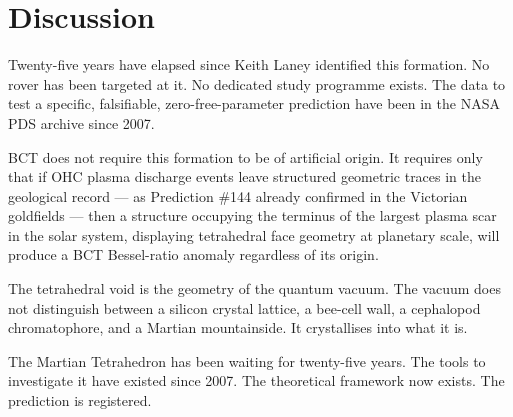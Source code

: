 \documentclass[12pt,twocolumn]{article}
\begin{document}
\section{Discussion}

Twenty-five years have elapsed since Keith Laney identified this
formation. No rover has been targeted at it. No dedicated study
programme exists. The data to test a specific, falsifiable,
zero-free-parameter prediction have been in the NASA PDS archive
since 2007.

BCT does not require this formation to be of artificial origin.
It requires only that if OHC plasma discharge events leave
structured geometric traces in the geological record --- as
Prediction \#144 already confirmed in the Victorian goldfields ---
then a structure occupying the terminus of the largest plasma scar
in the solar system, displaying tetrahedral face geometry at
planetary scale, will produce a BCT Bessel-ratio anomaly regardless
of its origin.

The tetrahedral void is the geometry of the quantum vacuum. The
vacuum does not distinguish between a silicon crystal lattice,
a bee-cell wall, a cephalopod chromatophore, and a Martian
mountainside. It crystallises into what it is.

The Martian Tetrahedron has been waiting for twenty-five years.
The tools to investigate it have existed since 2007. The theoretical
framework now exists. The prediction is registered.
\end{document}
